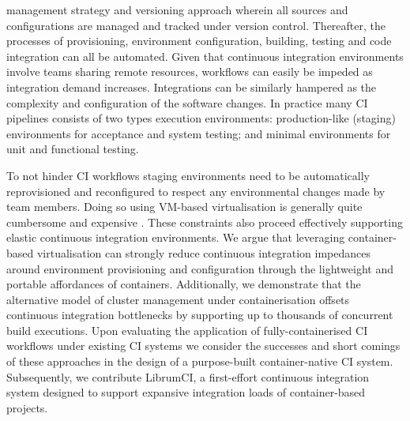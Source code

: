 \documentclass{report}
\begin{document}
management strategy and versioning approach wherein all sources
and configurations are managed and tracked under version control. Thereafter,
the processes of provisioning, environment configuration, building, testing and code integration
can all be automated. Given that continuous integration environments involve
teams sharing remote resources, workflows can easily 
be impeded as integration demand increases. Integrations can be similarly
hampered as the complexity and configuration of the software changes.
In practice many CI pipelines consists of two types execution environments:
production-like (staging) environments for acceptance and system testing; and minimal 
environments for unit and functional testing. 
\par
To not hinder CI workflows staging environments need to be automatically 
reprovisioned and reconfigured to respect any environmental changes made by team members.
Doing so using VM-based virtualisation is generally quite cumbersome and expensive \citep{Gambi}.
These constraints also proceed effectively supporting elastic continuous integration environments.
We argue that leveraging container-based virtualisation can strongly reduce
continuous integration impedances around environment provisioning and configuration
through the lightweight and portable affordances of containers. Additionally, we demonstrate
that the alternative model of cluster management under containerisation offsets continuous
integration bottlenecks by supporting up to thousands of concurrent build executions.
Upon evaluating the application of fully-containerised CI workflows under existing CI systems 
we consider the successes and short comings of these approaches in the design of a purpose-built container-native
CI system. Subsequently, we contribute LibrumCI, a first-effort continuous integration system designed 
to support expansive integration loads of container-based projects. 
%
%
%
\end{document}

